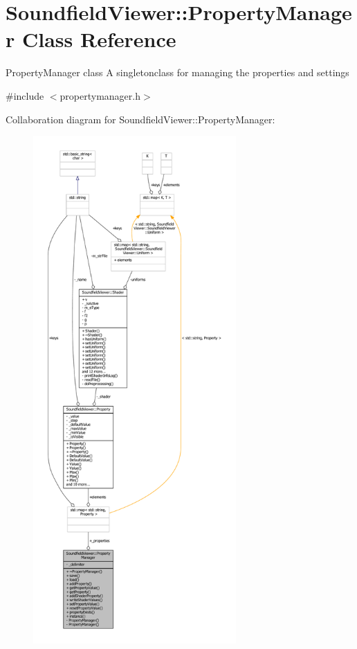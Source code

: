 \section{Soundfield\-Viewer\-:\-:Property\-Manager Class Reference}
\label{classSoundfieldViewer_1_1PropertyManager}


Property\-Manager class A singletonclass for managing the properties and settings  




{\ttfamily \#include $<$propertymanager.\-h$>$}



Collaboration diagram for Soundfield\-Viewer\-:\-:Property\-Manager\-:\nopagebreak
\begin{figure}[H]
\begin{center}
\leavevmode
\includegraphics[height=550pt]{d5/d90/classSoundfieldViewer_1_1PropertyManager__coll__graph}
\end{center}
\end{figure}
